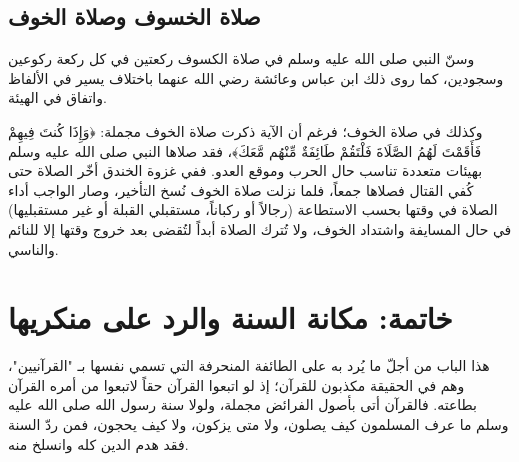 \subsection{صلاة الخسوف وصلاة الخوف}
وسنّ النبي صلى الله عليه وسلم في صلاة الكسوف ركعتين في كل ركعة ركوعين وسجودين، كما روى ذلك ابن عباس وعائشة رضي الله عنهما باختلاف يسير في الألفاظ واتفاق في الهيئة.

وكذلك في صلاة الخوف؛ فرغم أن الآية ذكرت صلاة الخوف مجملة: ﴿وَإِذَا كُنتَ فِيهِمْ فَأَقَمْتَ لَهُمُ الصَّلَاةَ فَلْتَقُمْ طَائِفَةٌ مِّنْهُم مَّعَكَ﴾، فقد صلاها النبي صلى الله عليه وسلم بهيئات متعددة تناسب حال الحرب وموقع العدو. ففي غزوة الخندق أخّر الصلاة حتى كُفي القتال فصلاها جمعاً، فلما نزلت صلاة الخوف نُسخ التأخير، وصار الواجب أداء الصلاة في وقتها بحسب الاستطاعة (رجالاً أو ركباناً، مستقبلي القبلة أو غير مستقبليها) في حال المسايفة واشتداد الخوف، ولا تُترك الصلاة أبداً لتُقضى بعد خروج وقتها إلا للنائم والناسي.

\section{خاتمة: مكانة السنة والرد على منكريها}
هذا الباب من أجلّ ما يُرد به على الطائفة المنحرفة التي تسمي نفسها بـ "القرآنيين"، وهم في الحقيقة مكذبون للقرآن؛ إذ لو اتبعوا القرآن حقاً لاتبعوا من أمره القرآن بطاعته. فالقرآن أتى بأصول الفرائض مجملة، ولولا سنة رسول الله صلى الله عليه وسلم ما عرف المسلمون كيف يصلون، ولا متى يزكون، ولا كيف يحجون، فمن ردّ السنة فقد هدم الدين كله وانسلخ منه.